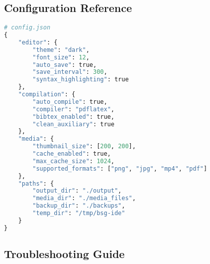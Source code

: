 \documentclass[11pt,a4paper]{article}
\begin{document}
\subsection{Configuration Reference}

\begin{tcolorbox}[title=Sample Configuration File]
\begin{lstlisting}[language=Python]
# config.json
{
    "editor": {
        "theme": "dark",
        "font_size": 12,
        "auto_save": true,
        "save_interval": 300,
        "syntax_highlighting": true
    },
    "compilation": {
        "auto_compile": true,
        "compiler": "pdflatex",
        "bibtex_enabled": true,
        "clean_auxiliary": true
    },
    "media": {
        "thumbnail_size": [200, 200],
        "cache_enabled": true,
        "max_cache_size": 1024,
        "supported_formats": ["png", "jpg", "mp4", "pdf"]
    },
    "paths": {
        "output_dir": "./output",
        "media_dir": "./media_files",
        "backup_dir": "./backups",
        "temp_dir": "/tmp/bsg-ide"
    }
}
\end{lstlisting}
\end{tcolorbox}

\subsection{Troubleshooting Guide}
\end{document}
